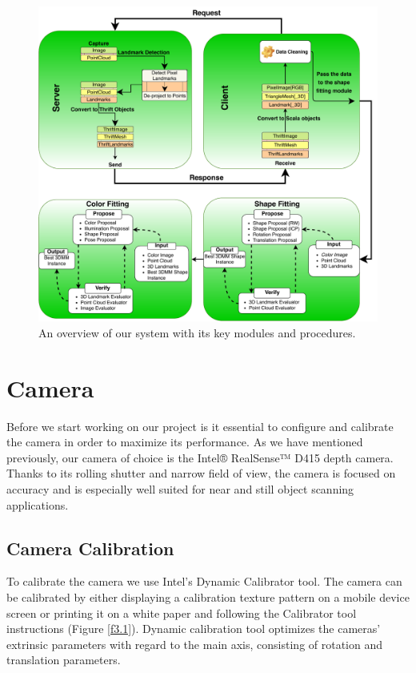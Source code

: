 \begin{figure}
  \centering
  \includegraphics[width=\textwidth]{Figures/FittingFlowNew.pdf}
  \caption{An overview of our system with its key modules and procedures.}
  \label{flow}
\end{figure}

\section{Camera}
Before we start working on our project is it essential to configure and calibrate the camera in order to maximize its performance. As we have mentioned previously, our camera of choice is the Intel® RealSense™ D415 depth camera. Thanks to its rolling shutter and narrow field of view, the camera is focused on accuracy and is especially well suited for near and still object scanning applications. 

\subsection{Camera Calibration}
To calibrate the camera we use Intel's Dynamic Calibrator tool. The camera can be calibrated by either displaying a calibration texture pattern on a mobile device screen or printing it on a white paper and following the Calibrator tool instructions (Figure \ref{f3.1}). Dynamic calibration tool optimizes the cameras' extrinsic parameters with regard to the main axis, consisting of rotation and translation parameters\cite{cal}. 

